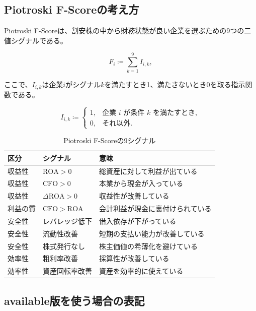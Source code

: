 \documentclass[11pt,a4paper]{article}
\newcommand{\CFO}{\mathrm{CFO}}
\begin{document}
\subsection{Piotroski F-Scoreの考え方}

Piotroski F-Scoreは、割安株の中から財務状態が良い企業を選ぶための9つの二値シグナルである。

\begin{equation}
F_i \coloneqq \sum_{k=1}^{9} I_{i,k},
\label{eq:piotroski}
\end{equation}

ここで、$I_{i,k}$は企業$i$がシグナル$k$を満たすとき1、満たさないとき0を取る指示関数である。

\begin{equation}
I_{i,k} \coloneqq
\begin{cases}
1, & \text{企業 } i \text{ が条件 } k \text{ を満たすとき},\\
0, & \text{それ以外}.
\end{cases}
\label{eq:indicator}
\end{equation}

\begin{table}[tbp]
\caption{Piotroski F-Scoreの9シグナル}
\label{tab:piotroski}
\centering
\scriptsize
\begin{tabularx}{\linewidth}{p{22mm}p{30mm}Y}
\toprule
区分 & シグナル & 意味 \\
\midrule
収益性 & $\mathrm{ROA}>0$ & 総資産に対して利益が出ている \\
収益性 & $\CFO>0$ & 本業から現金が入っている \\
収益性 & $\Delta\mathrm{ROA}>0$ & 収益性が改善している \\
利益の質 & $\CFO>\mathrm{ROA}$ & 会計利益が現金に裏付けられている \\
安全性 & レバレッジ低下 & 借入依存が下がっている \\
安全性 & 流動性改善 & 短期の支払い能力が改善している \\
安全性 & 株式発行なし & 株主価値の希薄化を避けている \\
効率性 & 粗利率改善 & 採算性が改善している \\
効率性 & 資産回転率改善 & 資産を効率的に使えている \\
\bottomrule
\end{tabularx}
\end{table}

\subsection{available版を使う場合の表記}
\end{document}
